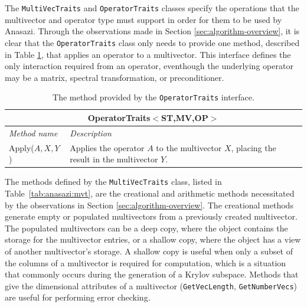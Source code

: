 \documentclass[acmtoms]{acmtrans2m}
\newcounter{algorithm}
\newcommand{\aspace}[1]{\texttt{#1}}
\begin{document}
The \aspace{MultiVecTraits} and \aspace{OperatorTraits} classes specify
the operations that the multivector and operator type must support in order for them to be
used by Anasazi. Through the observations made in Section \ref{sec:algorithm-overview}, 
it is clear that the \aspace{OperatorTraits} class only needs to provide one method,
described in Table \ref{tab:anasazi:opt}, that applies an operator to a multivector.  
This interface defines the only interaction required from an operator, eventhough
the underlying operator may be a matrix, 
spectral transformation, or preconditioner.
\begin{table}[bth]
\begin{center}
  \caption{The method provided by the \aspace{OperatorTraits} interface.}
\label{tab:anasazi:opt}
\begin{tabular}{| p{4cm} | p{8cm} |}
\hline
\multicolumn{2}{|c|}{\textbf{OperatorTraits$<$ST,MV,OP$>$}} \\\hline
\emph{Method name} & \emph{Description} \\\hline
Apply($A,X,Y$) & Applies the operator $A$ to the multivector $X$, placing the
result in the multivector $Y$. \\
\hline
\end{tabular}
\end{center}
\end{table}

The methods defined by the \aspace{MultiVecTraits} class, listed in
Table~\ref{tab:anasazi:mvt}, are the creational and arithmetic methods necessitated
by the observations in Section \ref{sec:algorithm-overview}.
The creational methods generate empty or populated multivectors from a previously
created multivector. The populated multivectors can be 
a deep copy, where the object contains the storage for the multivector entries, or a shallow copy, 
where the object has a view of another multivector's storage.
A shallow copy is useful when only a
subset of the columns of a multivector is required for computation, which is a situation that commonly occurs
during the generation of a Krylov subspace.  Methods that give the dimensional attributes of
a multivector (\aspace{GetVecLength}, \aspace{GetNumberVecs}) are useful for performing error checking.

\end{document}
